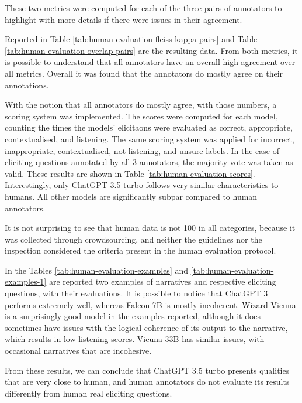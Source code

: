 
These two metrics were computed for each of the three pairs of annotators to highlight with more details if there were issues in their agreement. 


Reported in Table \ref{tab:human-evaluation-fleiss-kappa-pairs} and Table \ref{tab:human-evaluation-overlap-pairs} are the resulting data. From both metrics, it is possible to understand that all annotators have an overall high agreement over all metrics.
Overall it was found that the annotators do mostly agree on their annotations.


With the notion that all annotators do mostly agree, with those numbers, a scoring system was implemented. The scores were computed for each model, counting the times the models' elicitaons were evaluated as correct, appropriate, contextualised, and listening. The same scoring system was applied for incorrect, inappropriate, contextualised, not listening, and unsure labels. In the case of eliciting questions annotated by all 3 annotators, the majority vote was taken as valid. These results are shown in Table \ref{tab:human-evaluation-scores}.
Interestingly, only ChatGPT 3.5 turbo follows very similar characteristics to humans. All other models are significantly subpar compared to human annotators. 



It is not surprising to see that human data is not 100 in all categories, because it was collected through crowdsourcing, and neither the guidelines nor the inspection considered the criteria present in the human evaluation protocol. 

In the Tables \ref{tab:human-evaluation-examples} and \ref{tab:human-evaluation-examples-1} are reported two examples of narratives and respective eliciting questions, with their evaluations. It is possible to notice that ChatGPT 3 performs extremely well, whereas Falcon 7B is mostly incoherent. Wizard Vicuna is a surprisingly good model in the examples reported, although it does sometimes have issues with the logical coherence of its output to the narrative, which results in low listening scores. Vicuna 33B has similar issues, with occasional narratives that are incohesive. 

From these results, we can conclude that ChatGPT 3.5 turbo presents qualities that are very close to human, and human annotators do not evaluate its results differently from human real eliciting questions. 

